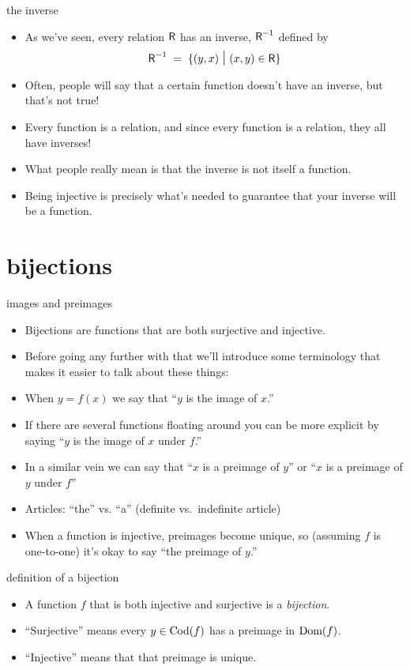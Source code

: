 \documentclass[handout,landscape]{beamer}
\begin{document}
\begin{frame}{the inverse}
\begin{itemize}
\item As we've seen, every relation $\mbox{\textsf R}$ has an inverse, $\mbox{\textsf R}^{-1}$ defined by
\[ \relR^{-1} \; = \; \{ (y,x) \, \suchthat \, (x,y) \in \relR \} \]
\pause
\item Often, people will say that a certain function doesn't have an inverse, but that's not true! \pause
\item Every function is a relation, and since every function is a relation, they all have inverses! \pause
\item What people really mean is that the inverse is not itself a function. \pause
\item Being injective is precisely what's needed to guarantee that your inverse will be a function.
\end{itemize}
\end{frame}

\section{bijections}

\begin{frame}{images and preimages}
\begin{itemize}
\item Bijections are functions that are both surjective and injective. \pause
\item Before going any further with that we'll introduce some terminology that makes it easier to talk about these things:\pause
\item When $y = f(x)$ we say that ``$y$ is the image of $x$.'' \pause
\item If there are several functions floating around you can be more explicit by saying \newline
``$y$ is the image of $x$ under $f$.'' \pause
\item In a similar vein we can say that ``$x$ is a preimage of $y$'' or  ``$x$ is a preimage of $y$ under $f$'' 
\item Articles: ``the'' vs. ``a'' \pause (definite vs.\ indefinite article) \pause
\item When a function is injective, preimages become unique, so (assuming $f$ is one-to-one) it's okay to say ``the preimage of $y$.''
\end{itemize}
\end{frame}

\begin{frame}{definition of a bijection}
\begin{itemize}
\item A function $f$ that is both injective and surjective is a {\em bijection}. \pause
\item ``Surjective'' means every $y \in \mbox{Cod}(f)$ has a preimage in $\mbox{Dom}(f)$. \pause
\item ``Injective'' means that that preimage is unique. \pause
\end{itemize}
\end{frame}
\end{document}
